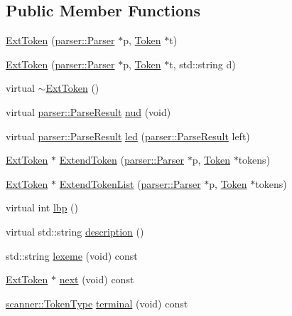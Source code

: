 \subsection*{Public Member Functions}
\begin{DoxyCompactItemize}
\item 
\hyperlink{classfcal_1_1scanner_1_1ExtToken_afda92e9d2c7b66f2b9aaed8ac07bca46}{Ext\+Token} (\hyperlink{classfcal_1_1parser_1_1Parser}{parser\+::\+Parser} $\ast$p, \hyperlink{classfcal_1_1scanner_1_1Token}{Token} $\ast$t)
\item 
\hyperlink{classfcal_1_1scanner_1_1ExtToken_aa6846c2c9fb91a37715b0f41a0ffcda4}{Ext\+Token} (\hyperlink{classfcal_1_1parser_1_1Parser}{parser\+::\+Parser} $\ast$p, \hyperlink{classfcal_1_1scanner_1_1Token}{Token} $\ast$t, std\+::string d)
\item 
virtual \hyperlink{classfcal_1_1scanner_1_1ExtToken_a13fe524a7fa31549acd6c5e8769d0a84}{$\sim$\+Ext\+Token} ()
\item 
virtual \hyperlink{classfcal_1_1parser_1_1ParseResult}{parser\+::\+Parse\+Result} \hyperlink{classfcal_1_1scanner_1_1ExtToken_a2e1ca27a07d55593ffd67780dbcad7dd}{nud} (void)
\item 
virtual \hyperlink{classfcal_1_1parser_1_1ParseResult}{parser\+::\+Parse\+Result} \hyperlink{classfcal_1_1scanner_1_1ExtToken_a42c352ef5e019a1155be80b4a40deb38}{led} (\hyperlink{classfcal_1_1parser_1_1ParseResult}{parser\+::\+Parse\+Result} left)
\item 
\hyperlink{classfcal_1_1scanner_1_1ExtToken}{Ext\+Token} $\ast$ \hyperlink{classfcal_1_1scanner_1_1ExtToken_ad6a5965961553c85d7fbaa688fabf052}{Extend\+Token} (\hyperlink{classfcal_1_1parser_1_1Parser}{parser\+::\+Parser} $\ast$p, \hyperlink{classfcal_1_1scanner_1_1Token}{Token} $\ast$tokens)
\item 
\hyperlink{classfcal_1_1scanner_1_1ExtToken}{Ext\+Token} $\ast$ \hyperlink{classfcal_1_1scanner_1_1ExtToken_a4995af1527ea8ba6ee99f3fa8646856d}{Extend\+Token\+List} (\hyperlink{classfcal_1_1parser_1_1Parser}{parser\+::\+Parser} $\ast$p, \hyperlink{classfcal_1_1scanner_1_1Token}{Token} $\ast$tokens)
\item 
virtual int \hyperlink{classfcal_1_1scanner_1_1ExtToken_adecef3770f08e5a26f103ab62171cc91}{lbp} ()
\item 
virtual std\+::string \hyperlink{classfcal_1_1scanner_1_1ExtToken_a29a72149492d7fef7968a1b894d334c7}{description} ()
\item 
std\+::string \hyperlink{classfcal_1_1scanner_1_1ExtToken_a32d06bece581a1711625c3a503db21e1}{lexeme} (void) const 
\item 
\hyperlink{classfcal_1_1scanner_1_1ExtToken}{Ext\+Token} $\ast$ \hyperlink{classfcal_1_1scanner_1_1ExtToken_aa927cdbdee70b7e74e0aee075f340472}{next} (void) const 
\item 
\hyperlink{namespacefcal_1_1scanner_ad95bd8241e3350b2d765f6b929eb0d93}{scanner\+::\+Token\+Type} \hyperlink{classfcal_1_1scanner_1_1ExtToken_a0bc057f41ebfeab0900a467af3798bbf}{terminal} (void) const 
\end{DoxyCompactItemize}
